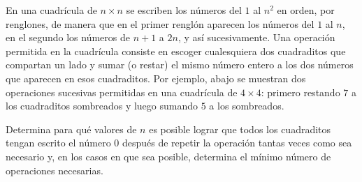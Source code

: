 En una cuadrícula de $n \times n$ se escriben los números del $1$ al $n^2$ en orden, por renglones,
de manera que en el primer renglón aparecen los números del $1$ al $n$, en el segundo los
números de $n + 1$ a $2n$, y así sucesivamente. Una operación permitida en la cuadrícula
consiste en escoger cualesquiera dos cuadraditos que compartan un lado y sumar (o restar)
el mismo número entero a los dos números que aparecen en esos cuadraditos. Por ejemplo, abajo se muestran dos operaciones sucesivas permitidas en una cuadrícula de $4 \times 4$:
primero restando $7$ a los cuadraditos sombreados y luego sumando $5$ a los sombreados.

Determina para qué valores de $n$ es posible lograr que todos los cuadraditos tengan escrito
el número $0$ después de repetir la operación tantas veces como sea necesario y, en los casos
en que sea posible, determina el mínimo número de operaciones necesarias.